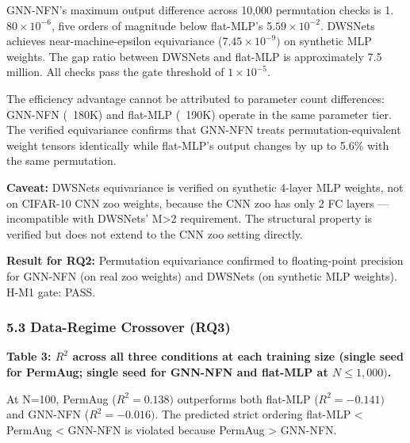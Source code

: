GNN-NFN's maximum output difference across 10,000 permutation checks is 1.$80\times 10^{-6}$, five orders of magnitude below flat-MLP's 5.$59\times 10^{-2}$. DWSNets achieves near-machine-epsilon equivariance (7.$45\times 10^{-9})$ on synthetic MLP weights. The gap ratio between DWSNets and flat-MLP is approximately 7.5 million. All checks pass the gate threshold of $1\times 10^{-5}$.

The efficiency advantage cannot be attributed to parameter count differences: GNN-NFN (~180K) and flat-MLP (~190K) operate in the same parameter tier. The verified equivariance confirms that GNN-NFN treats permutation-equivalent weight tensors identically while flat-MLP's output changes by up to 5.6\% with the same permutation.

\textbf{Caveat:} DWSNets equivariance is verified on synthetic 4-layer MLP weights, not on CIFAR-10 CNN zoo weights, because the CNN zoo has only 2 FC layers --- incompatible with DWSNets' M>2 requirement. The structural property is verified but does not extend to the CNN zoo setting directly.

\textbf{Result for RQ2:} Permutation equivariance confirmed to floating-point precision for GNN-NFN (on real zoo weights) and DWSNets (on synthetic MLP weights). H-M1 gate: PASS.

\subsubsection{5.3 Data-Regime Crossover (RQ3)}

\textbf{Table 3: $R^2$ across all three conditions at each training size (single seed for PermAug; single seed for GNN-NFN and flat-MLP at $N\leq 1,000)$.}

\begin{table}[htbp]
\centering
{}
\end{table}

At N=100, PermAug ($R^{2}=0.138)$ outperforms both flat-MLP ($R^{2}=-0.141)$ and GNN-NFN ($R^{2}=-0.016)$. The predicted strict ordering flat-MLP < PermAug < GNN-NFN is violated because PermAug > GNN-NFN.

